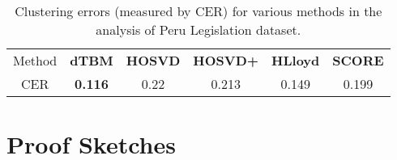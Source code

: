 \documentclass[lettersize,onecolumn,journal]{IEEEtran}
\theoremstyle{definition}
\theoremstyle{definition}
\begin{document}
\begin{table}[ht]
    \centering
    \begin{tabular}{c |c  c cc c}
    \hline
        Method & \textbf{\small dTBM} 
        &\textbf{\small HOSVD}
        &\textbf{\small HOSVD+} & \textbf{\small HLloyd} &  \textbf{\small SCORE}\\
         CER & \textbf{0.116}
         &  0.22 
         &0.213 & 0.149 &0.199\\
         \hline
    \end{tabular}
    \caption{Clustering errors (measured by CER) for various methods in the analysis of Peru Legislation dataset.}
    \label{tab:peru}
\end{table}



\section{Proof Sketches}\label{sec:mainproof}
\end{document}

